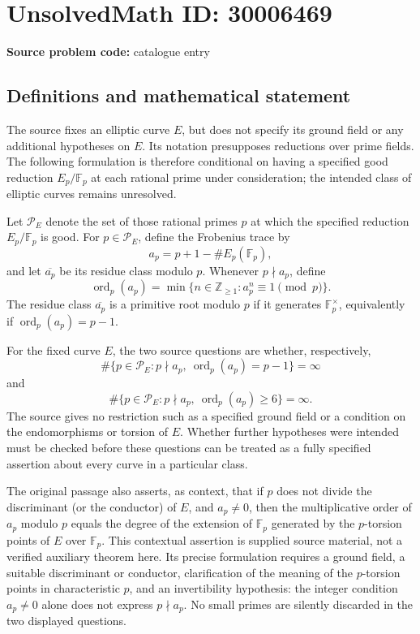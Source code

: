 \documentclass[11pt]{article}
\newcommand{\Z}{\mathbb{Z}}
\newcommand{\F}{\mathbb{F}}
\begin{document}
\section*{UnsolvedMath ID: 30006469}
\textbf{Source problem code:} catalogue entry
\subsection{Definitions and mathematical statement}
The source fixes an elliptic curve \(E\), but does not specify its ground field or any additional hypotheses on \(E\). Its notation presupposes reductions over prime fields. The following formulation is therefore conditional on having a specified good reduction \(E_p/\F_p\) at each rational prime under consideration; the intended class of elliptic curves remains unresolved.

Let \(\mathcal P_E\) denote the set of those rational primes \(p\) at which the specified reduction \(E_p/\F_p\) is good. For \(p\in\mathcal P_E\), define the Frobenius trace by
\[
a_p=p+1-\#E_p(\F_p),
\]
and let \(\overline{a_p}\) be its residue class modulo \(p\). Whenever \(p\nmid a_p\), define
\[
\operatorname{ord}_p(a_p)=\min\{n\in\Z_{\geq 1}:a_p^n\equiv 1\pmod p\}.
\]
The residue class \(\overline{a_p}\) is a primitive root modulo \(p\) if it generates \(\F_p^{\times}\), equivalently if \(\operatorname{ord}_p(a_p)=p-1\).

For the fixed curve \(E\), the two source questions are whether, respectively,
\[
\#\{p\in\mathcal P_E:p\nmid a_p,\ \operatorname{ord}_p(a_p)=p-1\}=\infty
\]
and
\[
\#\{p\in\mathcal P_E:p\nmid a_p,\ \operatorname{ord}_p(a_p)\geq 6\}=\infty.
\]
The source gives no restriction such as a specified ground field or a condition on the endomorphisms or torsion of \(E\). Whether further hypotheses were intended must be checked before these questions can be treated as a fully specified assertion about every curve in a particular class.

The original passage also asserts, as context, that if \(p\) does not divide the discriminant (or the conductor) of \(E\), and \(a_p\neq 0\), then the multiplicative order of \(a_p\) modulo \(p\) equals the degree of the extension of \(\F_p\) generated by the \(p\)-torsion points of \(E\) over \(\F_p\). This contextual assertion is supplied source material, not a verified auxiliary theorem here. Its precise formulation requires a ground field, a suitable discriminant or conductor, clarification of the meaning of the \(p\)-torsion points in characteristic \(p\), and an invertibility hypothesis: the integer condition \(a_p\neq 0\) alone does not express \(p\nmid a_p\). No small primes are silently discarded in the two displayed questions.
\end{document}

